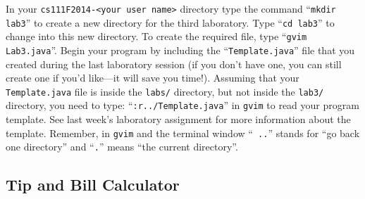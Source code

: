 In your {\tt cs111F2014-<your user name>} directory type the command ``{\tt mkdir lab3}'' to create a new directory for
the third laboratory.  \noindent Type ``{\tt cd lab3}'' to change into this new directory.  To create the required file,
type ``{\tt gvim Lab3.java}''. Begin your program by including the ``{\tt Template.java}'' file that you created during
the last laboratory session (if you don't have one, you can still create one if you'd like---it will save you time!).
Assuming that your {\tt Template.java} file is inside the {\tt labs/} directory, but not inside the {\tt lab3/}
directory, you need to type: ``{\tt :r../Template.java}'' in {\tt gvim} to read your program template.  See last week's
laboratory assignment for more information about the template. Remember, in {\tt gvim} and the terminal window ``{\tt
  ..}'' stands for ``go back one directory'' and ``{\tt .}'' means ``the current directory''.

\vspace{-0.15in}
\subsection*{Tip and Bill Calculator}


